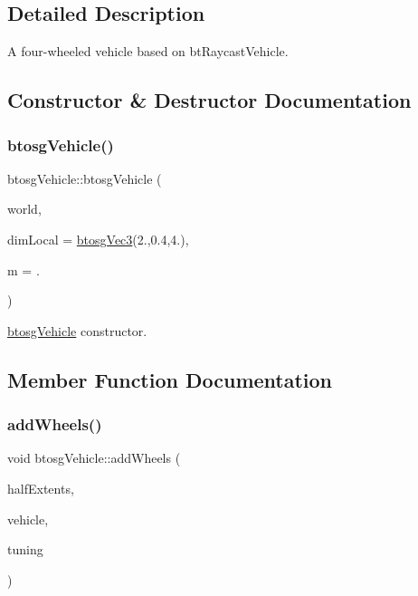 \subsection{Detailed Description}
A four-\/wheeled vehicle based on bt\+Raycast\+Vehicle. 

\subsection{Constructor \& Destructor Documentation}
\mbox{\label{classbtosgVehicle_aa754dd94553b8690763e4c24d1f26227}} 
\subsubsection{\texorpdfstring{btosgVehicle()}{btosgVehicle()}}
{\footnotesize\ttfamily btosg\+Vehicle\+::btosg\+Vehicle (\begin{DoxyParamCaption}\item[{\mbox{\hyperlink{classbtosgWorld}{btosg\+World}} $\ast$}]{world,  }\item[{\mbox{\hyperlink{classbtosgVec3}{btosg\+Vec3}}}]{dim\+Local = {\ttfamily \mbox{\hyperlink{classbtosgVec3}{btosg\+Vec3}}(2.,0.4,4.)},  }\item[{double}]{m = {.} }\end{DoxyParamCaption})\hspace{0.3cm}{\ttfamily [inline]}}

\mbox{\hyperlink{classbtosgVehicle}{btosg\+Vehicle}} constructor. 

\subsection{Member Function Documentation}
\mbox{\label{classbtosgVehicle_a98971fb952c08cb72341a0c333fc66de}} 
\subsubsection{\texorpdfstring{addWheels()}{addWheels()}}
{\footnotesize\ttfamily void btosg\+Vehicle\+::add\+Wheels (\begin{DoxyParamCaption}\item[{bt\+Vector3 $\ast$}]{half\+Extents,  }\item[{bt\+Raycast\+Vehicle $\ast$}]{vehicle,  }\item[{bt\+Raycast\+Vehicle\+::bt\+Vehicle\+Tuning}]{tuning }\end{DoxyParamCaption})\hspace{0.3cm}{\ttfamily [inline]}}


